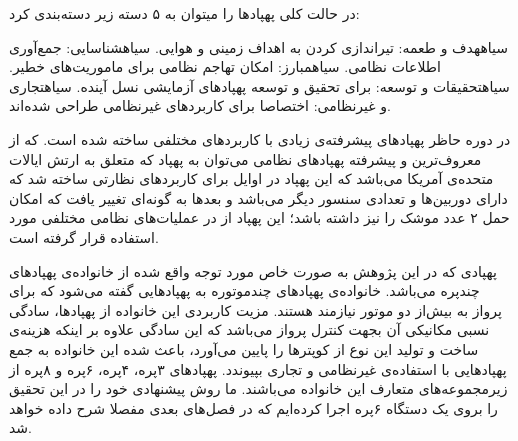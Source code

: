 \noindent در حالت کلی پهپادها را میتوان به ۵ دسته زیر دسته‌بندی کرد:
\begin{enumerate}\setlength\itemsep{0em}
 ‌سیاه{هدف و طعمه:} تیراندازی کردن به اهداف زمینی و هوایی.
 ‌سیاه{شناسایی:} جمع‌آوری اطلاعات نظامی.
 ‌سیاه{مبارز:} امکان تهاجم نظامی برای ماموریت‌های خطیر.
 ‌سیاه{تحقیقات و توسعه:} برای تحقیق و توسعه پهپادهای آزمایشی نسل آینده.
 ‌سیاه{تجاری و غیرنظامی:} اختصاصا برای کاربردهای غیرنظامی طراحی شده‌اند.
\end{enumerate}

در دوره حاظر پهپادهای پیشرفته‌ی زیادی با کاربردهای مختلفی ساخته شده است. که از معروف‌ترین و پیشرفته پهپادهای نظامی می‌توان به پهپاد  که متعلق به ارتش ایالات متحده‌ی آمریکا می‌باشد که این پهپاد در اوایل  برای کاربردهای نظارتی ساخته شد که دارای دوربین‌ها و تعدادی سنسور دیگر می‌باشد و بعدها به گونه‌ای تغییر یافت که امکان حمل ۲ عدد موشک را نیز داشته باشد؛ این پهپاد از  در عملیات‌های نظامی مختلفی مورد استفاده قرار گرفته است.


پهپادی که در این پژوهش به صورت خاص مورد توجه واقع شده از خانواده‌ی پهپاد‌های چندپره می‌باشد. خانواده‌ی پهپادهای چندموتوره به پهپادهایی گفته می‌شود که برای پرواز به بیش‌از دو موتور نیازمند هستند. مزیت کاربردی این خانواده از پهپادها، سادگی نسبی مکانیکی آن بجهت کنترل پرواز می‌باشد که این سادگی علاوه بر اینکه هزینه‌ی ساخت و تولید این نوع از کوپترها را پایین می‌آورد، باعث شده این خانواده به جمع پهپادهایی با استفاده‌ی غیرنظامی و تجاری بپیوندد. پهپادهای ۳پره، ۴پره، ۶پره و ۸پره از زیرمجموعه‌های متعارف این خانواده می‌باشند. ما روش پیشنهادی خود را در این تحقیق را بروی یک دستگاه ۶پره اجرا کرده‌ایم که در فصل‌های بعدی مفصلا شرح داده خواهد شد.

